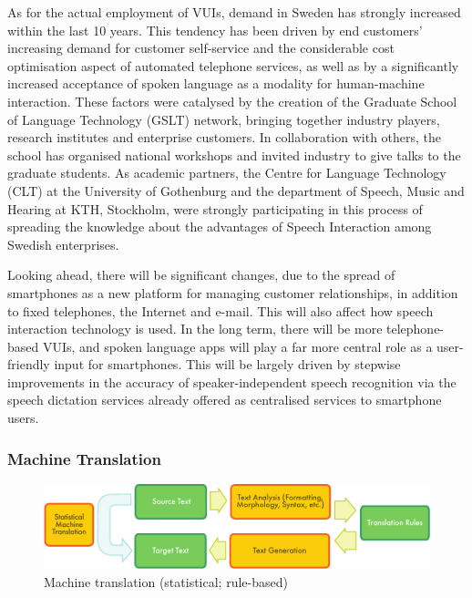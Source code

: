 \begin{multicols}{2}
As for the actual employment of VUIs, demand in Sweden has strongly
increased within the last 10 years. This tendency has been driven by
end customers’ increasing demand for customer self-service and the
considerable cost optimisation aspect of automated telephone services,
as well as by a significantly increased acceptance of spoken language
as a modality for human-machine interaction. These factors were
catalysed by the creation of the Graduate School of Language
Technology (GSLT) network, bringing together industry players,
research institutes and enterprise customers. In collaboration with
others, the school has organised national workshops and invited
industry to give talks to the graduate students. As academic partners,
the Centre for Language Technology (CLT) at the University of
Gothenburg and the department of Speech, Music and Hearing at KTH,
Stockholm, were strongly participating in this process of spreading
the knowledge about the advantages of Speech Interaction among Swedish
enterprises.

Looking ahead, there will be significant changes, due to the spread of
smartphones as a new platform for managing customer relationships, in
addition to fixed telephones, the Internet and e-mail. This will also
affect how speech interaction technology is used. In the long term,
there will be more telephone-based VUIs, and spoken language apps will
play a far more central role as a user-friendly input for
smartphones. This will be largely driven by stepwise improvements in
the accuracy of speaker-independent speech recognition via the speech
dictation services already offered as centralised services to
smartphone users.

\subsubsection{Machine Translation}

\begin{figure}[htb]
  \center
  \includegraphics[width=\textwidth]{../_media/english/machine_translation}
  \caption{Machine translation (statistical; rule-based)}
  \label{fig:mtarch_en}
\end{figure}



\end{multicols}
